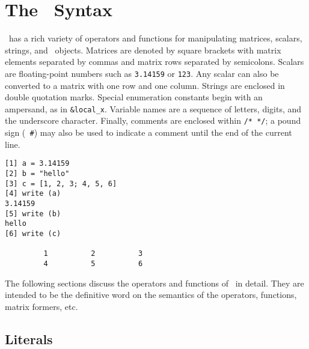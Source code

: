 
\newcommand{\op}{\mbox{\rm\ op }}

\newpage{\pagestyle{empty}\cleardoublepage}

\chapter{The \burlap\ Syntax}
\label{burlap.syntax}

\burlap\ has a rich variety of operators and functions for
manipulating matrices, scalars, strings, and \felt\ objects.  Matrices
are denoted by square brackets with matrix elements separated by
commas and matrix rows separated by semicolons.  Scalars are
floating-point numbers such as {\tt 3.14159} or {\tt 123}.  Any scalar
can also be converted to a matrix with one row and one column.
Strings are enclosed in double quotation marks.  Special enumeration
constants begin with an ampersand, as in {\tt\&local\_x}.  Variable
names are a sequence of letters, digits, and the underscore character.
Finally, comments are enclosed within {\tt /* */}; a pound sign ({\tt
\#}) may also be used to indicate a comment until the end of the
current line.

\begin{screen}
\begin{verbatim}
[1] a = 3.14159
[2] b = "hello"
[3] c = [1, 2, 3; 4, 5, 6]
[4] write (a)
3.14159
[5] write (b)
hello
[6] write (c)

         1          2          3 
         4          5          6 
\end{verbatim}
\end{screen}

The following sections discuss the operators and functions of \burlap\
in detail.  They are intended to be the definitive word on the
semantics of the operators, functions, matrix formers, etc.


\section{Literals}
\label{burlap.syntax.literals}

